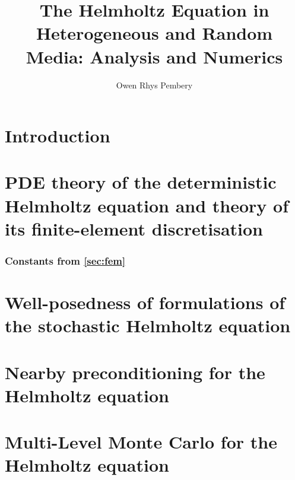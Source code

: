 \documentclass{report}
\title{The Helmholtz Equation in Heterogeneous and Random Media: Analysis and Numerics}
\author{Owen Rhys Pembery}
\begin{document}
\maketitle



\tableofcontents



\chapter{Introduction}\label{chap:intro}


\chapter{PDE theory of the deterministic Helmholtz equation and theory of its finite-element discretisation}\label{chap:background}




\subsection{Constants from \cref{sec:fem}}\label{app:constants}


%

%

\chapter{Well-posedness of formulations of the stochastic Helmholtz equation}\label{chap:stochastic}
 
















\chapter{Nearby preconditioning for the Helmholtz equation}\label{chap:nbpc}


\chapter{Multi-Level Monte Carlo for the Helmholtz equation}\label{chap:mlmc}
\end{document}
